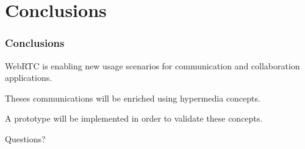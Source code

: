 \documentclass[t]{beamer}
\begin{document}
\begin{frame}[c]
\begin{ganttchart}{1}{36}


\end{ganttchart}

	\end{frame}




\section{Conclusions}\label{concl} %


\begin{frame}[c]
		\frametitle{Conclusions}

WebRTC is enabling new usage scenarios for communication and collaboration applications.
		\vfill

Theses communications will be enriched using hypermedia concepts.
		\vfill

A prototype will be implemented in order to validate these concepts.


	\end{frame}






\begin{frame}[c]
\Huge{\centerline{Questions?}}
\end{frame}

\end{document}
